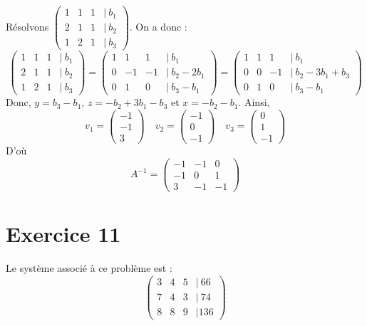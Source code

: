 \documentclass[a4paper, titlepage]{article}
\begin{document}
	Résolvons $\begin{pmatrix} 1&1&1&|~b_1\\2&1&1&|~b_2\\1&2&1&|~b_3 \end{pmatrix}$. On a donc :
	$$ \begin{pmatrix} 1&1&1&|~b_1\\2&1&1&|~b_2\\1&2&1&|~b_3 \end{pmatrix} = \begin{pmatrix} 1&1&1&|~b_1\\0&-1&-1&|~b_2-2b_1\\0&1&0&|~b_3-b_1 \end{pmatrix} = \begin{pmatrix} 1&1&1&|~b_1\\0&0&-1&|~b_2-3b_1+b_3\\0&1&0&|~b_3-b_1 \end{pmatrix} $$
	Donc, $y=b_3-b_1$, $z=-b_2+3b_1-b_3$ et $x=-b_2-b_1$.
	Ainsi,
	$$ v_1= \begin{pmatrix} -1\\-1\\3 \end{pmatrix}\quad v_2= \begin{pmatrix} -1\\0\\-1 \end{pmatrix} \quad v_3 = \begin{pmatrix} 0\\1\\-1 \end{pmatrix}  $$
	D'où $$ A^{-1} = \begin{pmatrix} -1&-1&0\\-1&0&1\\3&-1&-1 \end{pmatrix}  $$
	\section*{Exercice 11}
	Le système associé à ce problème est :
	$$ \begin{pmatrix} 3&4&5&|~66\\7&4&3&|~74\\8&8&9&|136 \end{pmatrix}  $$
\end{document}
